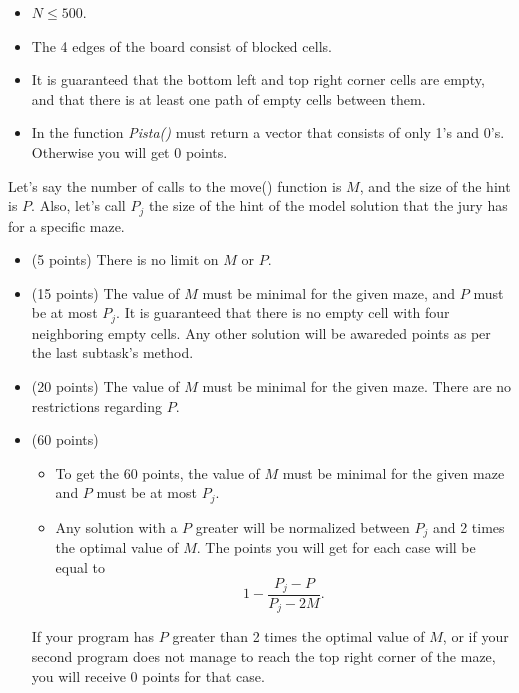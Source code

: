 \documentclass[12pt]{scrartcl}
\begin{document}

        \begin{itemize}
            \item $N \le 500$.
            \item The 4 edges of the board consist of blocked cells.
            \item It is guaranteed that the bottom left and top right corner cells are empty, and that there is at least one path of empty cells between them.
            \item In the function \textit{Pista()} must return a vector that consists of only 1's and 0's. Otherwise you will get 0 points.
        \end{itemize}
        

    Let's say the number of calls to the move() function is $M$, and the size of the hint is $P$.
    Also, let's call $P_j$ the size of the hint of the model solution that the jury has for a specific maze.

    \begin{itemize}
        \item (5 points) There is no limit on $M$ or $P$.
        \item (15 points) The value of $M$ must be minimal for the given maze, and $P$ must be at most $P_j$. It is guaranteed that there is no empty cell with four neighboring empty cells.
        Any other solution will be awareded points as per the last subtask's method.
        \item (20 points) The value of $M$ must be minimal for the given maze. There are no restrictions regarding $P$.
        \item (60 points)
        \begin{itemize}
            \item To get the 60 points, the value of $M$ must be minimal for the given maze and $P$ must be at most $P_j$.
            \item Any solution with a $P$ greater will be normalized between $P_j$ and 2 times the optimal value of $M$. The points you will get for each case will be equal to
            \[1 - \frac{P_j - P}{P_j - 2M}.\]
        \end{itemize}
    If your program has $P$ greater than 2 times the optimal value of $M$, or if your second program does not manage to reach the top right corner of the maze, you will receive 0 points for that case.
    \end{itemize}
\end{document}
